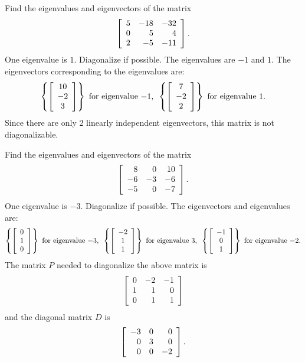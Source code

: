 \documentclass{ximera}
\begin{document}
\begin{example}
  Find the eigenvalues and eigenvectors of the matrix
  \begin{equation*}
    \startmat{rrr}
      5 & -18 & -32 \\
      0 & 5 & 4 \\
      2 & -5 & -11
    \stopmat.
  \end{equation*}
  One eigenvalue is $1$. Diagonalize if possible.
  The eigenvalues are $-1$ and $1$. The eigenvectors corresponding to
  the eigenvalues are:
  \begin{equation*}
    \set{\startmat{c}
        10 \\
        -2 \\
        3
      \stopmat} ~\mbox{for eigenvalue}~ {-1},
    \quad
    \set{\startmat{c}
        7 \\
        -2 \\
        2
      \stopmat} ~\mbox{for eigenvalue}~ {1}.
  \end{equation*}
  Since there are only 2 linearly independent eigenvectors, this
  matrix is not diagonalizable.
\end{example}

\begin{example}
  Find the eigenvalues and eigenvectors of the matrix
  \begin{equation*}
    \startmat{rrr}
      8 &   0 &  10 \\
      -6 &  -3 &  -6 \\
      -5 &   0 &  -7 \\
    \stopmat.
  \end{equation*}
  One eigenvalue is $-3$. Diagonalize if possible.
  The eigenvectors and eigenvalues are:
  \begin{equation*}
    \set{\startmat{c}
        0 \\
        1 \\
        0
      \stopmat} ~\mbox{for eigenvalue}~ {-3},
    \quad
    \set{\startmat{c}
        -2 \\
        1 \\
        1
      \stopmat} ~\mbox{for eigenvalue}~ {3},
    \quad
    \set{\startmat{c}
        -1 \\
        0 \\
        1
      \stopmat} ~\mbox{for eigenvalue}~ {-2}.
  \end{equation*}
  The matrix $P$ needed to diagonalize the above matrix is
  \begin{equation*}
    \startmat{rrr}
      0 &  -2 &  -1 \\
      1 &   1 &   0 \\
      0 &   1 &   1 \\
    \stopmat
  \end{equation*}
  and the diagonal matrix $D$ is
  \begin{equation*}
    \startmat{rrr}
      -3 &   0 &   0 \\
      0 &   3 &   0 \\
      0 &   0 &  -2 \\
    \stopmat.
  \end{equation*}
\end{example}
\end{document}

